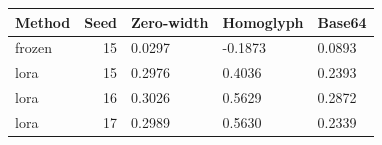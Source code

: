 \begin{tabular}{lrlll}
\toprule
Method & Seed & Zero-width & Homoglyph & Base64\\\midrule
frozen & 15 & 0.0297 & -0.1873 & 0.0893\\
lora & 15 & 0.2976 & 0.4036 & 0.2393\\
lora & 16 & 0.3026 & 0.5629 & 0.2872\\
lora & 17 & 0.2989 & 0.5630 & 0.2339\\
\bottomrule\end{tabular}
